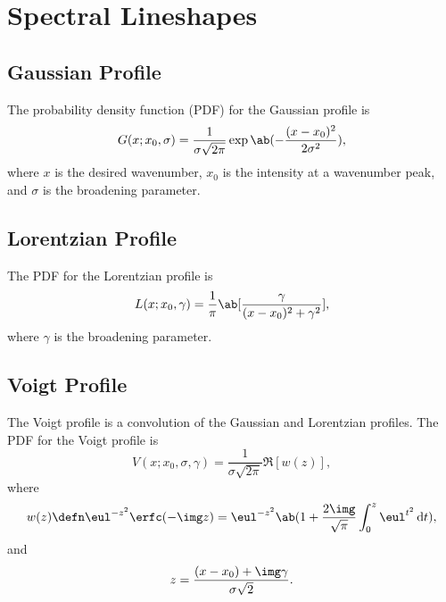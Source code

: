 \chapter{Spectral Lineshapes}
\label{c:spectral_lineshapes}

\section{Gaussian Profile}
\label{s:gaussian_profile}

The probability density function (PDF) for the Gaussian profile is
\begin{equation*}
    G(x; x_{0}, \sigma) = \frac{1}{\sigma\sqrt{2\pi}}\exp\ab(-\frac{(x - x_{0})^{2}}{2\sigma^{2}}),
\end{equation*}
where $x$ is the desired wavenumber, $x_{0}$ is the intensity at a wavenumber peak, and $\sigma$ is the broadening parameter.

\section{Lorentzian Profile}
\label{s:lorentzian_profile}

The PDF for the Lorentzian profile is
\begin{equation*}
    L(x; x_{0}, \gamma) = \frac{1}{\pi}\ab[\frac{\gamma}{(x - x_{0})^{2} + \gamma^{2}}],
\end{equation*}
where $\gamma$ is the broadening parameter.

\section{Voigt Profile}
\label{s:voigt_profile}

The Voigt profile is a convolution of the Gaussian and Lorentzian profiles. The PDF for the Voigt profile is
\begin{equation*}
    V(x; x_{0}, \sigma, \gamma) = \frac{1}{\sigma\sqrt{2\pi}}\Re[w(z)],
\end{equation*}
where
\begin{equation*}
    w(z) \defn \eul^{-z^{2}}\erfc(-\img z) = \eul^{-z^{2}}\ab(1 +
    \frac{2\img}{\sqrt{\pi}}\int_{0}^{z} \eul^{t^{2}} \odif{t}),
\end{equation*}
and
\begin{equation*}
    z = \frac{(x - x_{0}) + \img\gamma}{\sigma\sqrt{2}}.
\end{equation*}

